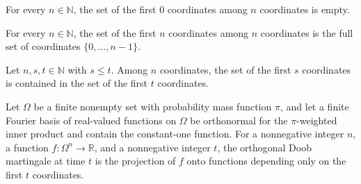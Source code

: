 \begin{theorem}
\label{FABL.firstCoordinates_zero}
\leanok
{}
For every $n\in\mathbb{N}$, the set of the first $0$ coordinates among $n$ coordinates
is empty.
\end{theorem}

\begin{theorem}
\label{FABL.firstCoordinates_dimension}
\leanok
{}
For every $n\in\mathbb{N}$, the set of the first $n$ coordinates among $n$ coordinates
is the full set of coordinates $\{0,\ldots,n-1\}$.
\end{theorem}

\begin{theorem}
\label{FABL.firstCoordinates_mono}
\leanok
{}
Let $n,s,t\in\mathbb{N}$ with $s\le t$. Among $n$ coordinates, the set of the first $s$
coordinates is contained in the set of the first $t$ coordinates.
\end{theorem}

\begin{definition}
\label{FABL.FiniteFourierBasis.orthogonalDoobMartingale}
\leanok
{}
Let $\Omega$ be a finite nonempty set with probability mass function $\pi$, and let a
finite Fourier basis of real-valued functions on $\Omega$ be orthonormal for the
$\pi$-weighted inner product and contain the constant-one function. For a nonnegative
integer $n$, a function $f\colon\Omega^n\to\mathbb{R}$, and a nonnegative integer $t$,
the orthogonal Doob martingale at time $t$ is the projection of $f$ onto functions
depending only on the first $t$ coordinates.
\end{definition}

